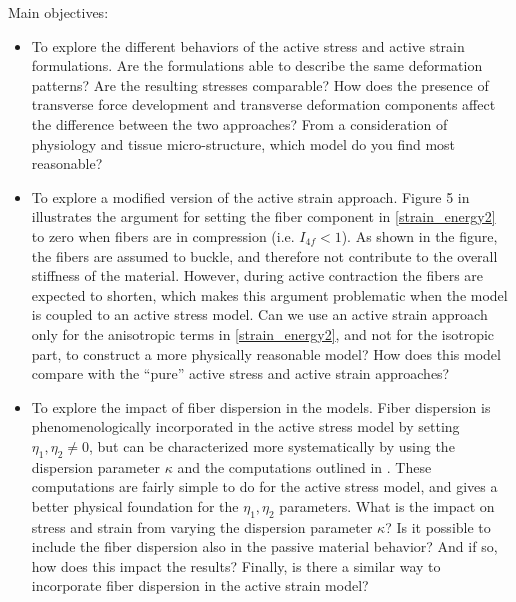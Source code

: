 \documentclass[epsfig,11pt]{article}
\begin{document}
\begin{description}
\item{Main objectives:} 
\begin{itemize}
\item To explore the different behaviors of the active stress and active strain formulations. Are the formulations able to describe the same deformation patterns? Are the resulting stresses comparable? How does the presence of transverse force development and transverse deformation components affect the difference between the two approaches? From a consideration of physiology and tissue micro-structure, which model do you find most reasonable?

\item To explore a modified version of the active strain approach. Figure 5 in \cite{Holzapfel:2009bb} illustrates the argument for setting the fiber component in \eqref{strain_energy2} to zero when fibers are in compression (i.e. $I_{4f}<1$). 
As shown in the figure, the fibers are assumed to buckle, and therefore not contribute to the overall stiffness of the material.
However, during active contraction the fibers are expected to shorten, which makes this argument problematic when the model is coupled to an active stress model. Can we use an active strain approach only for the anisotropic terms in \eqref{strain_energy2}, and not for the isotropic part, to construct a more physically reasonable model? How does this model compare with the ``pure'' active stress and active strain approaches?

\item To explore the impact of fiber dispersion in the models. Fiber dispersion is phenomenologically incorporated in the active stress model by setting $\eta_1, \eta_2 \neq 0$, but can be characterized more systematically by using the dispersion parameter $\kappa$ and the computations outlined in \cite{Gasser:2006kd}. These computations are fairly simple to do for the active stress model, and gives a better physical foundation for the $\eta_1, \eta_2$ parameters. What is the impact on stress and strain from varying the dispersion parameter $\kappa$? Is it possible to include the fiber dispersion also in the passive material behavior? And if so, how does this impact the results? Finally, is there a similar way to incorporate fiber dispersion in the active strain model?
\end{itemize}


\end{description}
\end{document}
